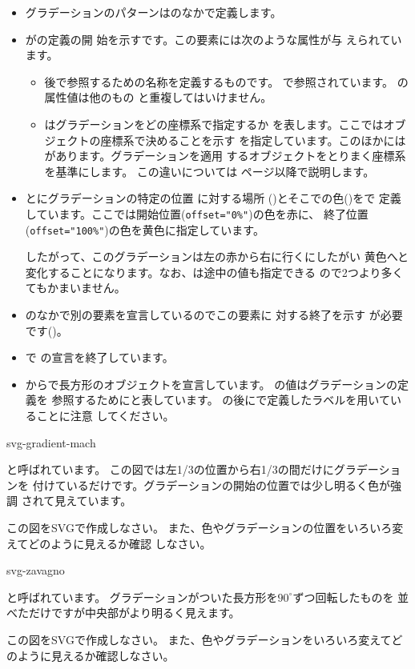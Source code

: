 \begin{itemize}
 \item グラデーションのパターンはのなかで定義します。
 \item {}がの定義の開
       始を示すです。この要素には次のような属性が与
       えられています。
\begin{itemize}
 \item {} 後で参照するための名称を定義するものです。
       で参照されています。 の属性値は他のもの
       と重複してはいけません。
 \item {} はグラデーションをどの座標系で指定するか
       を表します。ここではオブジェクトの座標系で決めることを示す
        を指定しています。このほかには
        があります。グラデーションを適用
       するオブジェクトをとりまく座標系を基準にします。
この違いについては
       \pageref{diff-gradientUnits}ページ以降で説明します。
\end{itemize}
 \item {}とにグラデーションの特定の位置
       に対する場所
       ()とそこでの色()をで
       定義しています。ここでは開始位置(\texttt{offset="0\%"})の色を赤に、
       終了位置(\texttt{offset="100\%"})の色を黄色に指定しています。

       したがって、このグラデーションは左の赤から右に行くにしたがい
       黄色へと変化することになります。なお、は途中の値も指定できる
       ので2つより多くてもかまいません。
 \item {}のなかで別の要素を宣言しているのでこの要素に
       対する終了を示す が必要です()。
 \item {}で の宣言を終了しています。
 \item {}からで長方形のオブジェクトを宣言しています。
         の値はグラデーションの定義を 
       参照するためにと表しています。
       \Showattrib{\#}の後にで定義したラベルを用いていることに注意
       してください。
\end{itemize}
{svg-gradient-mach}
{と呼ばれています。
この図では左1/3の位置から右1/3の間だけにグラデーションを
付けているだけです。グラデーションの開始の位置では少し明るく色が強調
されて見えています。
\par
この図をSVGで作成しなさい。
また、色やグラデーションの位置をいろいろ変えてどのように見えるか確認
しなさい。} 
%
{svg-zavagno}
{と呼ばれています。
グラデーションがついた長方形を$90^{\circ}$ずつ回転したものを
並べただけですが中央部がより明るく見えます。
\par
この図をSVGで作成しなさい。
また、色やグラデーションをいろいろ変えてどのように見えるか確認しなさい。}
